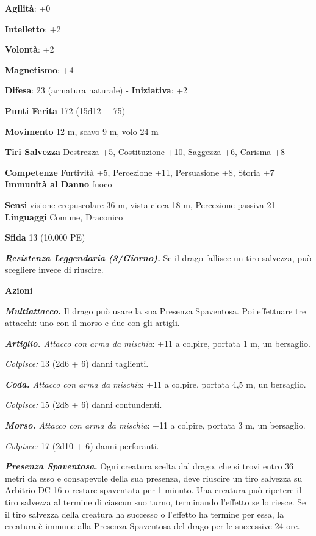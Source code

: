 \begin{multicols}{2}
\textbf{Agilità}: +0

\textbf{Intelletto}: +2

\textbf{Volontà}: +2

\textbf{Magnetismo}: +4

\textbf{Difesa}: 23 (armatura naturale) - \textbf{Iniziativa}: +2

\textbf{Punti Ferita} 172 (15d12 + 75)

\textbf{Movimento} 12 m, scavo 9 m, volo 24 m

\textbf{Tiri Salvezza} Destrezza +5, Costituzione +10, Saggezza +6,
Carisma +8

\textbf{Competenze} Furtività +5, Percezione +11, Persuasione +8, Storia +7
\textbf{Immunità al Danno} fuoco

\textbf{Sensi} visione crepuscolare 36 m, vista cieca 18 m, Percezione passiva
21 \textbf{Linguaggi} Comune, Draconico

\textbf{Sfida} 13 (10.000 PE)\smallskip

\emph{\textbf{Resistenza Leggendaria (3/Giorno).}} Se il drago fallisce
un tiro salvezza, può scegliere invece di riuscire.

\smallskip\textbf{Azioni}

\emph{\textbf{Multiattacco.}} Il drago può usare la sua Presenza
Spaventosa. Poi effettuare tre attacchi: uno con il morso e due con gli
artigli.

\emph{\textbf{Artiglio.} Attacco con arma da mischia}: +11 a colpire,
portata 1 m, un bersaglio.

\emph{Colpisce:} 13 (2d6 + 6) danni taglienti.

\emph{\textbf{Coda.} Attacco con arma da mischia}: +11 a colpire,
portata 4,5 m, un bersaglio.

\emph{Colpisce:} 15 (2d8 + 6) danni contundenti.

\emph{\textbf{Morso.} Attacco con arma da mischia}: +11 a colpire,
portata 3 m, un bersaglio.

\emph{Colpisce:} 17 (2d10 + 6) danni perforanti.

\emph{\textbf{Presenza Spaventosa.}} Ogni creatura scelta dal drago, che
si trovi entro 36 metri da esso e consapevole della sua presenza, deve
riuscire un tiro salvezza su Arbitrio DC 16 o restare spaventata per 1
minuto. Una creatura può ripetere il tiro salvezza al termine di ciascun
suo turno, terminando l'effetto se lo riesce. Se il tiro salvezza della
creatura ha successo o l'effetto ha termine per essa, la creatura è
immune alla Presenza Spaventosa del drago per le successive 24 ore.


\end{multicols}
